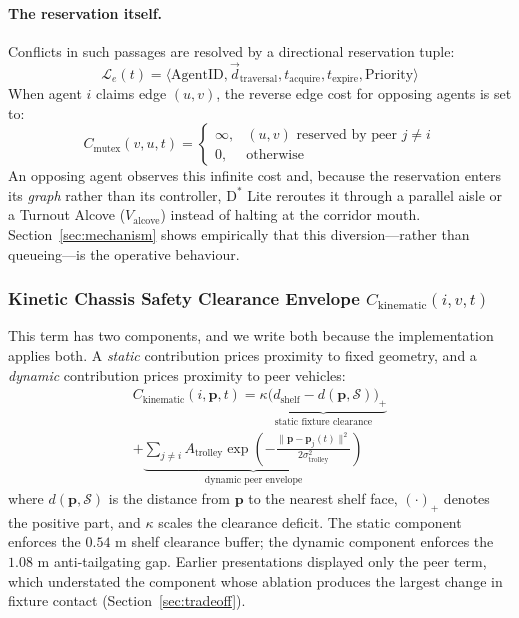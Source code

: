\documentclass[journal]{IEEEtran}
\begin{document}
\paragraph{The reservation itself.}
Conflicts in such passages are resolved by a directional reservation tuple:
\begin{equation}
\mathcal{L}_e(t) = \langle \text{AgentID}, \vec{d}_{\text{traversal}}, t_{\text{acquire}}, t_{\text{expire}}, \text{Priority} \rangle
\end{equation}
When agent $i$ claims edge $(u, v)$, the reverse edge cost for opposing agents is set to:
\begin{equation}
C_{\text{mutex}}(v, u, t) = \begin{cases} \infty, & (u, v) \text{ reserved by peer } j \neq i \\ 0, & \text{otherwise} \end{cases}
\end{equation}
An opposing agent observes this infinite cost and, because the reservation enters its \emph{graph} rather than its controller, $\text{D}^*$ Lite reroutes it through a parallel aisle or a Turnout Alcove ($V_{\text{alcove}}$) instead of halting at the corridor mouth. Section~\ref{sec:mechanism} shows empirically that this diversion---rather than queueing---is the operative behaviour.

\subsubsection{Kinetic Chassis Safety Clearance Envelope \texorpdfstring{$C_{\text{kinematic}}(i, v, t)$}{C\_kinematic(i, v, t)}}
This term has two components, and we write both because the implementation applies
both. A \emph{static} contribution prices proximity to fixed geometry, and a
\emph{dynamic} contribution prices proximity to peer vehicles:
\begin{multline}
C_{\text{kinematic}}(i, \mathbf{p}, t) =
\underbrace{\kappa\big(d_{\text{shelf}} - d(\mathbf{p}, \mathcal{S})\big)_{+}}_{\text{static fixture clearance}} \\
+ \underbrace{\sum_{j \neq i} A_{\text{trolley}} \exp\!\left( -\frac{\|\mathbf{p} - \mathbf{p}_j(t)\|^2}{2\sigma_{\text{trolley}}^2} \right)}_{\text{dynamic peer envelope}}
\end{multline}
where $d(\mathbf{p}, \mathcal{S})$ is the distance from $\mathbf{p}$ to the nearest
shelf face, $(\cdot)_{+}$ denotes the positive part, and $\kappa$ scales the
clearance deficit. The static component enforces the $0.54\text{ m}$ shelf clearance
buffer; the dynamic component enforces the $1.08\text{ m}$ anti-tailgating gap.
Earlier presentations displayed only the peer term, which understated the component
whose ablation produces the largest change in fixture contact
(Section~\ref{sec:tradeoff}).
\end{document}
